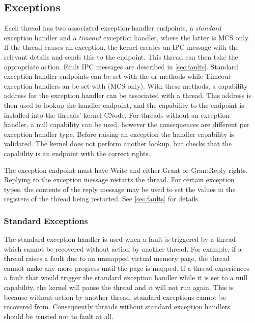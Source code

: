 \subsection{Exceptions}
\label{sec:exceptions}

Each thread has two associated exception-handler endpoints, a \emph{standard}
exception handler and a \emph{timeout} exception handler, where the latter is MCS
only. If the thread causes
an exception, the kernel creates an IPC message with the relevant details and
sends this to the endpoint. This thread can then take the appropriate action.
Fault IPC messages are described in \autoref{sec:faults}.  Standard exception-handler
endpoints can be set with the  or
 methods while Timeout exception
handlers an be set with  (MCS only).
With these methods, a
capability address for the exception handler can be associated with a thread.
This address is then used to lookup the handler endpoint, and the capability to
the endpoint is installed into the threads' kernel CNode.  For threads without
an exception handler, a null capability can be used, however the consequences
are different per exception handler type.  Before raising an exception the
handler capability is validated. The kernel does not perform another lookup,
but checks that the capability is an endpoint with the correct rights.

The exception endpoint must have Write and either Grant or GrantReply rights.
Replying to the exception message restarts the thread. For certain exception
types, the contents of the reply message may be used to set the values in the
registers of the thread being restarted.  See \autoref{sec:faults} for details.

\subsubsection{Standard Exceptions}

The standard exception handler is used when a fault is triggered by a thread
which cannot be recovered without action by another thread.  For example, if a
thread raises a fault due to an unmapped virtual memory page, the thread cannot
make any more progress until the page is mapped.  If a thread experiences a
fault that would trigger the standard exception handler while it is set to a
null capability, the kernel will pause the thread and it will not run again.
This is because without action by another thread, standard exceptions cannot be
recovered from.  Consequently threads without standard exception handlers
should be trusted not to fault at all.

